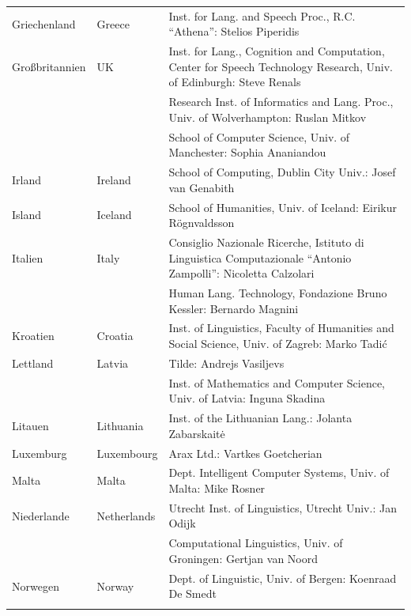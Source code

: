 \documentclass[]{../../metanetpaper}
\begin{document}
\begin{longtable}{llp{105mm}}
  Griechenland & \textcolor{grey1}{Greece} & Inst. for Lang. and Speech Proc., R.C. “Athena”: Stelios Piperidis\\ \addlinespace
  Großbritannien & \textcolor{grey1}{UK} & Inst. for Lang., Cognition and Computation, Center for Speech Technology Research, Univ. of Edinburgh: Steve Renals \\ \addlinespace 
  & & Research Inst. of Informatics and Lang. Proc., Univ. of Wolverhampton: Ruslan Mitkov \\ \addlinespace 
  & & School of Computer Science, Univ. of Manchester: Sophia Ananiandou \\ \addlinespace 
  Irland & \textcolor{grey1}{Ireland} & School of Computing, Dublin City Univ.: Josef van Genabith\\ \addlinespace
  Island & \textcolor{grey1}{Iceland} & School of Humanities, Univ. of Iceland: Eirikur Rögnvaldsson\\ \addlinespace
  Italien & \textcolor{grey1}{Italy} & Consiglio Nazionale Ricerche, Istituto di Linguistica Computazionale “Antonio Zampolli”: Nicoletta Calzolari\\ \addlinespace
  & & Human Lang. Technology, Fondazione Bruno Kessler: Bernardo Magnini\\ \addlinespace 
  Kroatien & \textcolor{grey1}{Croatia} & Inst. of Linguistics, Faculty of Humanities and Social Science, Univ. of Zagreb: Marko Tadić \\ \addlinespace
  Lettland & \textcolor{grey1}{Latvia} & Tilde: Andrejs Vasiljevs\\ \addlinespace 
  & & Inst. of Mathematics and Computer Science, Univ. of Latvia: Inguna Skadina\\ \addlinespace
  Litauen & \textcolor{grey1}{Lithuania} & Inst. of the Lithuanian Lang.: Jolanta Zabarskaitė\\ \addlinespace
  Luxemburg & \textcolor{grey1}{Luxembourg} & Arax Ltd.: Vartkes Goetcherian\\ \addlinespace
  Malta & \textcolor{grey1}{Malta} & Dept. Intelligent Computer Systems, Univ. of Malta: Mike Rosner\\ \addlinespace
  Niederlande & \textcolor{grey1}{Netherlands} & Utrecht Inst. of Linguistics, Utrecht Univ.: Jan Odijk\\ \addlinespace 
  & & Computational Linguistics, Univ. of Groningen: Gertjan van Noord\\ \addlinespace
  Norwegen & \textcolor{grey1}{Norway} & Dept. of Linguistic, Univ. of Bergen: Koenraad De Smedt\\ \addlinespace 

\end{longtable}
\end{document}
